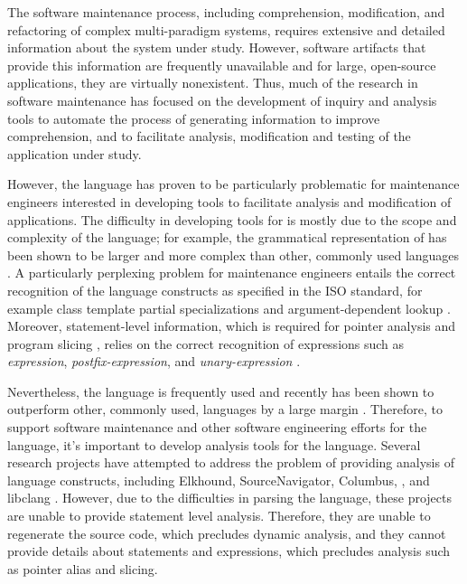 

The software maintenance process, including comprehension, modification,
and refactoring of complex multi-par\-a\-digm systems, requires 
extensive and detailed information about the system under study.
However, software artifacts that provide this information are
frequently unavailable and for large, open-source applications,
they are virtually nonexistent.
Thus, much of the research in software maintenance has focused 
on the development of inquiry and analysis tools to automate the
process of generating information to improve comprehension, and to 
facilitate analysis, modification and testing of the application under 
study.

However, the {\CPP} language has proven to be particularly problematic 
for maintenance engineers interested in developing tools to facilitate
analysis and modification of {\CPP} applications.
The difficulty in developing tools for {\CPP} is mostly 
due to the scope and complexity of the language; for example,
the grammatical representation of {\CPP} has been shown to be  
larger and more complex than other, commonly used
languages \cite{Power-Malloy:04}.
A particularly perplexing problem for {\CPP} maintenance engineers
 entails the correct recognition of the language constructs
as specified in the ISO standard, for example class template partial
specializations and argument-dependent lookup \cite[\S A.8]{C++standard98}.
Moreover, statement-level information,
which is required for pointer analysis and program 
slicing \cite{binkley2006,gallagher2003,Harrold1996MAY,Weiser84},
relies on the correct recognition of expressions such
as {\em expression}, {\em postfix-expression},
and {\em unary-expression} \cite[\S A.4]{C++standard98}.

Nevertheless, the {\CPP} language is frequently used and recently
has been shown to outperform other, commonly used, languages
by a large margin \cite{preez2011}.
Therefore, to support software maintenance and other software
engineering efforts for the {\CPP} language, it's important to
develop analysis tools for the language.
Several research projects have attempted to address the problem
of providing analysis of {\CPP} language constructs, including
Elkhound, {\sf SourceNavigator}\texttrademark, {\sf Columbus},
{\gfourre}, and libclang 
\cite{elsa2007,sourcenav,columbus2005,kraft05-wcre,kraft06-ist,www-libclang}.
However, due to the difficulties in parsing the {\CPP} language,
these projects are unable to provide statement level analysis.
Therefore, they are unable to regenerate the source code, which
precludes dynamic analysis, and they cannot provide details
about statements and expressions, which precludes analysis such
as pointer alias and slicing.

